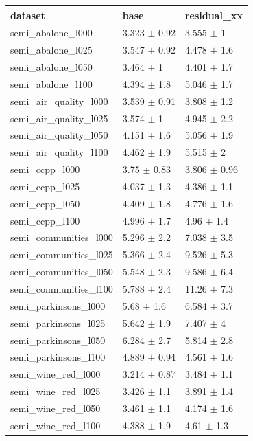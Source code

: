 \begin{tabular}{lll}
\toprule
dataset & base & residual\_xx \\
\midrule
semi\_abalone\_l000 & 3.323 $\pm$ 0.92 & 3.555 $\pm$ 1 \\
semi\_abalone\_l025 & 3.547 $\pm$ 0.92 & 4.478 $\pm$ 1.6 \\
semi\_abalone\_l050 & 3.464 $\pm$ 1 & 4.401 $\pm$ 1.7 \\
semi\_abalone\_l100 & 4.394 $\pm$ 1.8 & 5.046 $\pm$ 1.7 \\
semi\_air\_quality\_l000 & 3.539 $\pm$ 0.91 & 3.808 $\pm$ 1.2 \\
semi\_air\_quality\_l025 & 3.574 $\pm$ 1 & 4.945 $\pm$ 2.2 \\
semi\_air\_quality\_l050 & 4.151 $\pm$ 1.6 & 5.056 $\pm$ 1.9 \\
semi\_air\_quality\_l100 & 4.462 $\pm$ 1.9 & 5.515 $\pm$ 2 \\
semi\_ccpp\_l000 & 3.75 $\pm$ 0.83 & 3.806 $\pm$ 0.96 \\
semi\_ccpp\_l025 & 4.037 $\pm$ 1.3 & 4.386 $\pm$ 1.1 \\
semi\_ccpp\_l050 & 4.409 $\pm$ 1.8 & 4.776 $\pm$ 1.6 \\
semi\_ccpp\_l100 & 4.996 $\pm$ 1.7 & 4.96 $\pm$ 1.4 \\
semi\_communities\_l000 & 5.296 $\pm$ 2.2 & 7.038 $\pm$ 3.5 \\
semi\_communities\_l025 & 5.366 $\pm$ 2.4 & 9.526 $\pm$ 5.3 \\
semi\_communities\_l050 & 5.548 $\pm$ 2.3 & 9.586 $\pm$ 6.4 \\
semi\_communities\_l100 & 5.788 $\pm$ 2.4 & 11.26 $\pm$ 7.3 \\
semi\_parkinsons\_l000 & 5.68 $\pm$ 1.6 & 6.584 $\pm$ 3.7 \\
semi\_parkinsons\_l025 & 5.642 $\pm$ 1.9 & 7.407 $\pm$ 4 \\
semi\_parkinsons\_l050 & 6.284 $\pm$ 2.7 & 5.814 $\pm$ 2.8 \\
semi\_parkinsons\_l100 & 4.889 $\pm$ 0.94 & 4.561 $\pm$ 1.6 \\
semi\_wine\_red\_l000 & 3.214 $\pm$ 0.87 & 3.484 $\pm$ 1.1 \\
semi\_wine\_red\_l025 & 3.426 $\pm$ 1.1 & 3.891 $\pm$ 1.4 \\
semi\_wine\_red\_l050 & 3.461 $\pm$ 1.1 & 4.174 $\pm$ 1.6 \\
semi\_wine\_red\_l100 & 4.388 $\pm$ 1.9 & 4.61 $\pm$ 1.3 \\
\bottomrule
\end{tabular}
